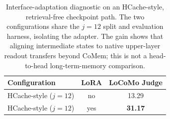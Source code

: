 \begin{table}[!t]
\centering
\small
\setlength{\tabcolsep}{5pt}
\begin{tabular}{@{}lcc@{}}
\toprule
\textbf{Configuration} & \textbf{LoRA} & \textbf{LoCoMo Judge} \\
\midrule
HCache-style ($j{=}12$) & no  & 13.29 \\
HCache-style ($j{=}12$) & yes & \textbf{31.17} \\
\bottomrule
\end{tabular}
\caption{Interface-adaptation diagnostic on an HCache-style, retrieval-free
checkpoint path. The two configurations share the $j{=}12$ split and evaluation
harness, isolating the adapter. The gain shows that aligning intermediate states
to native upper-layer readout transfers beyond CoMem; this is not a head-to-head
long-term-memory comparison.}
\label{tab:hcache-lora}
\end{table}